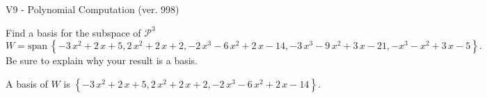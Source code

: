 \begin{exercise}
  \begin{exerciseTitle}V9 - Polynomial Computation (ver. 998)\end{exerciseTitle}
  \begin{exerciseStatement}
    Find a basis for the subspace of \(\mathcal{P}^3\) 
\[W=\mathrm{span}\ \left\{-3 \, x^{2} + 2 \, x + 5 , 2 \, x^{2} + 2 \, x + 2 , -2 \, x^{3} - 6 \, x^{2} + 2 \, x - 14 , -3 \, x^{3} - 9 \, x^{2} + 3 \, x - 21 , -x^{3} - x^{2} + 3 \, x - 5\right\}.\]
 Be sure to explain why your result is a basis.


  \end{exerciseStatement}
  \begin{exerciseAnswer}
   A basis of \(W\) is  \(\left\{-3 \, x^{2} + 2 \, x + 5 , 2 \, x^{2} + 2 \, x + 2 , -2 \, x^{3} - 6 \, x^{2} + 2 \, x - 14\right\}\).
  


  \end{exerciseAnswer}
\end{exercise}